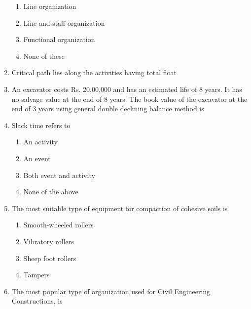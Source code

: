 \documentclass[11pt,a4paper]{article}
\begin{document}
\begin{enumerate}
\begin{enumerate}[label=\Alph*.]
\item{Line organization}
\item{Line and staff organization}
\item{Functional organization}
\item{None of these}
\end{enumerate}
\item{Critical path lies along the activities having total float}
\\
\item{An excavator costs Rs. 20,00,000 and has an estimated life of 8 years. It has no salvage value at the end of 8 years. The book value of the excavator at the end of 3 years using general double declining balance method is}
\\
\item{Slack time refers to}
\begin{enumerate}[label=\Alph*.]
\item{An activity}
\item{An event}
\item{Both event and activity}
\item{None of the above}
\end{enumerate}
\item{The most suitable type of equipment for compaction of cohesive soils is}
\begin{enumerate}[label=\Alph*.]
\item{Smooth-wheeled rollers}
\item{Vibratory rollers}
\item{Sheep foot rollers}
\item{Tampers}
\end{enumerate}
\item{The most popular type of organization used for Civil Engineering Constructions, is}

\end{enumerate}
\end{document}
